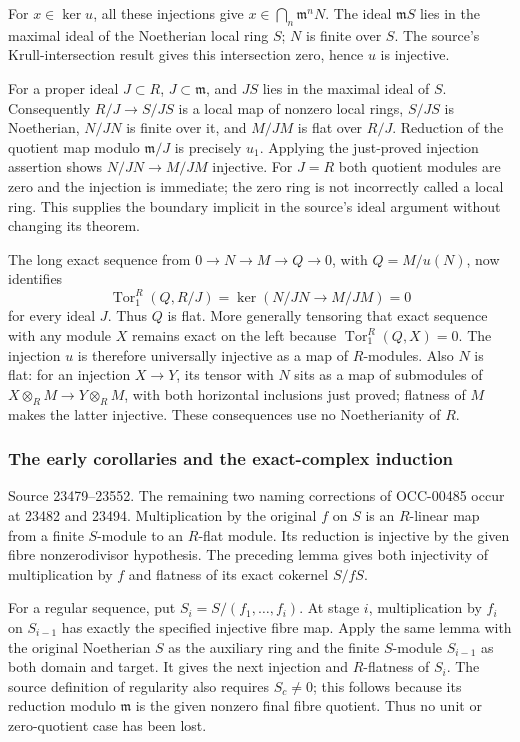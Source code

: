 For \(x\in\ker u\), all these injections give \(x\in\bigcap_n\mathfrak m^nN\). The ideal \(\mathfrak mS\) lies in the maximal ideal of the Noetherian local ring \(S\); \(N\) is finite over \(S\). The source's Krull-intersection result gives this intersection zero, hence \(u\) is injective.

For a proper ideal \(J\subset R\), \(J\subset\mathfrak m\), and \(JS\) lies in the maximal ideal of \(S\). Consequently \(R/J\to S/JS\) is a local map of nonzero local rings, \(S/JS\) is Noetherian, \(N/JN\) is finite over it, and \(M/JM\) is flat over \(R/J\). Reduction of the quotient map modulo \(\mathfrak m/J\) is precisely \(u_1\). Applying the just-proved injection assertion shows \(N/JN\to M/JM\) injective. For \(J=R\) both quotient modules are zero and the injection is immediate; the zero ring is not incorrectly called a local ring. This supplies the boundary implicit in the source's ideal argument without changing its theorem.

The long exact sequence from \(0\to N\to M\to Q\to0\), with \(Q=M/u(N)\), now identifies \[
\operatorname{Tor}_1^R(Q,R/J)
 =\ker(N/JN\to M/JM)=0
\] for every ideal \(J\). Thus \(Q\) is flat. More generally tensoring that exact sequence with any module \(X\) remains exact on the left because \(\operatorname{Tor}_1^R(Q,X)=0\). The injection \(u\) is therefore universally injective as a map of \(R\)-modules. Also \(N\) is flat: for an injection \(X\to Y\), its tensor with \(N\) sits as a map of submodules of \(X\otimes_RM\to Y\otimes_RM\), with both horizontal inclusions just proved; flatness of \(M\) makes the latter injective. These consequences use no Noetherianity of \(R\).

\subsubsection{The early corollaries and the exact-complex induction}\label{the-early-corollaries-and-the-exact-complex-induction}

Source 23479--23552. The remaining two naming corrections of OCC-00485 occur at 23482 and 23494. Multiplication by the original \(f\) on \(S\) is an \(R\)-linear map from a finite \(S\)-module to an \(R\)-flat module. Its reduction is injective by the given fibre nonzerodivisor hypothesis. The preceding lemma gives both injectivity of multiplication by \(f\) and flatness of its exact cokernel \(S/fS\).

For a regular sequence, put \(S_i=S/(f_1,\ldots,f_i)\). At stage \(i\), multiplication by \(f_i\) on \(S_{i-1}\) has exactly the specified injective fibre map. Apply the same lemma with the original Noetherian \(S\) as the auxiliary ring and the finite \(S\)-module \(S_{i-1}\) as both domain and target. It gives the next injection and \(R\)-flatness of \(S_i\). The source definition of regularity also requires \(S_c\ne0\); this follows because its reduction modulo \(\mathfrak m\) is the given nonzero final fibre quotient. Thus no unit or zero-quotient case has been lost.

